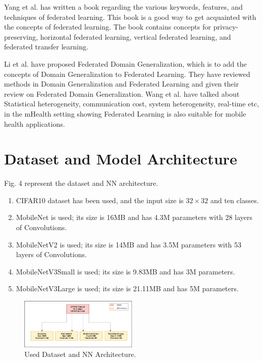 \documentclass[conference]{IEEEtran}
\begin{document}
\par Yang et al. \cite{yang2019federated} has written a book regarding the various keywords, features, and techniques of federated learning. This book is a good way to get acquainted with the concepts of federated learning. The book contains concepts for privacy-preserving, horizontal federated learning, vertical federated learning, and federated transfer learning. \par
Li et al. \cite{li2023federated} have proposed Federated Domain Generalization, which is to add the concepts of Domain Generalization to Federated Learning. They have reviewed methods in Domain Generalization and Federated Learning and given their review on Federated Domain Generalization. Wang et al. \cite{wang2023applications} have talked about Statistical heterogeneity, communication cost, system heterogeneity, real-time etc, in the mHealth setting showing Federated Learning is also suitable for mobile health applications.


\section{Dataset and Model Architecture}
Fig. 4 represent the dataset and NN architecture.
\begin{enumerate}
    \item CIFAR10 dataset has been used, and the input size is $32\times32$ and ten classes.
    \item MobileNet \cite{howard2017mobilenets} is used; its size is 16MB and has 4.3M parameters with 28 layers of Convolutions. 
    \item MobileNetV2 \cite{sandler2018mobilenetv2} is used; its size is 14MB and has 3.5M parameters with 53 layers of Convolutions.
    \item MobileNetV3Small \cite{howard2019searching} is used; its size is 9.83MB and has 3M parameters.
    \item MobileNetV3Large \cite{howard2019searching} is used; its size is 21.11MB and has 5M parameters.
\end{enumerate}

\begin{figure}[htp]
        \centering
        \includegraphics[width=0.5\textwidth]{Images/Dataset_and_architecture.png}
        \caption{Used Dataset and NN Architecture.}
    \end{figure}
    
\end{document}
